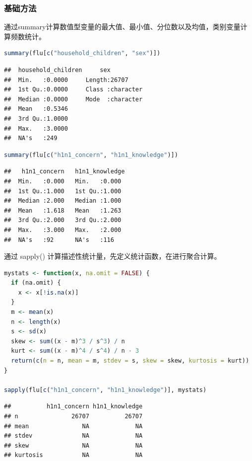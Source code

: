 \documentclass[]{ctexbook}
\begin{document}
\hypertarget{ux57faux7840ux65b9ux6cd5}{%
\subsubsection{基础方法}\label{ux57faux7840ux65b9ux6cd5}}

通过summary计算数值型变量的最大值、最小值、分位数以及均值，类别变量计算频数统计。

\begin{lstlisting}[language=R]
summary(flu[c("household_children", "sex")])
\end{lstlisting}

\begin{lstlisting}
##  household_children     sex           
##  Min.   :0.0000     Length:26707      
##  1st Qu.:0.0000     Class :character  
##  Median :0.0000     Mode  :character  
##  Mean   :0.5346                       
##  3rd Qu.:1.0000                       
##  Max.   :3.0000                       
##  NA's   :249
\end{lstlisting}

\begin{lstlisting}[language=R]
summary(flu[c("h1n1_concern", "h1n1_knowledge")])
\end{lstlisting}

\begin{lstlisting}
##   h1n1_concern   h1n1_knowledge 
##  Min.   :0.000   Min.   :0.000  
##  1st Qu.:1.000   1st Qu.:1.000  
##  Median :2.000   Median :1.000  
##  Mean   :1.618   Mean   :1.263  
##  3rd Qu.:2.000   3rd Qu.:2.000  
##  Max.   :3.000   Max.   :2.000  
##  NA's   :92      NA's   :116
\end{lstlisting}

通过 sapply() 计算描述性统计量，先定义统计函数，在进行聚合计算。

\begin{lstlisting}[language=R]
mystats <- function(x, na.omit = FALSE) {
  if (na.omit) {
    x <- x[!is.na(x)]
  }
  m <- mean(x)
  n <- length(x)
  s <- sd(x)
  skew <- sum((x - m)^3 / s^3) / n
  kurt <- sum((x - m)^4 / s^4) / n - 3
  return(c(n = n, mean = m, stdev = s, skew = skew, kurtosis = kurt))
}

sapply(flu[c("h1n1_concern", "h1n1_knowledge")], mystats)
\end{lstlisting}

\begin{lstlisting}
##          h1n1_concern h1n1_knowledge
## n               26707          26707
## mean               NA             NA
## stdev              NA             NA
## skew               NA             NA
## kurtosis           NA             NA
\end{lstlisting}
\end{document}
